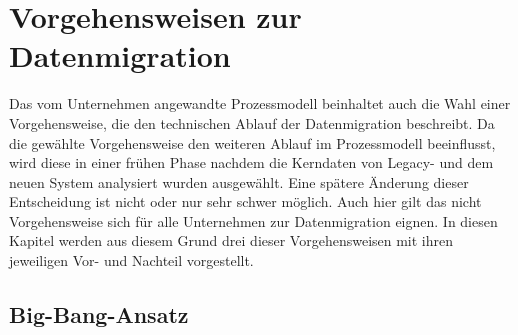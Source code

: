 \section{Vorgehensweisen zur Datenmigration}
\label{chapter:vorgehensweisen}


Das vom Unternehmen angewandte Prozessmodell beinhaltet auch die Wahl einer Vorgehensweise, die den technischen Ablauf der Datenmigration beschreibt. Da die gewählte Vorgehensweise den weiteren Ablauf im Prozessmodell beeinflusst, wird diese in einer frühen Phase nachdem die Kerndaten von Legacy- und dem neuen System analysiert wurden ausgewählt. Eine spätere Änderung dieser Entscheidung ist nicht oder nur sehr schwer möglich. Auch hier gilt das nicht Vorgehensweise sich für alle Unternehmen zur Datenmigration eignen. In diesen Kapitel werden aus diesem Grund drei dieser Vorgehensweisen mit ihren jeweiligen Vor- und Nachteil vorgestellt. 

\subsection{Big-Bang-Ansatz}

